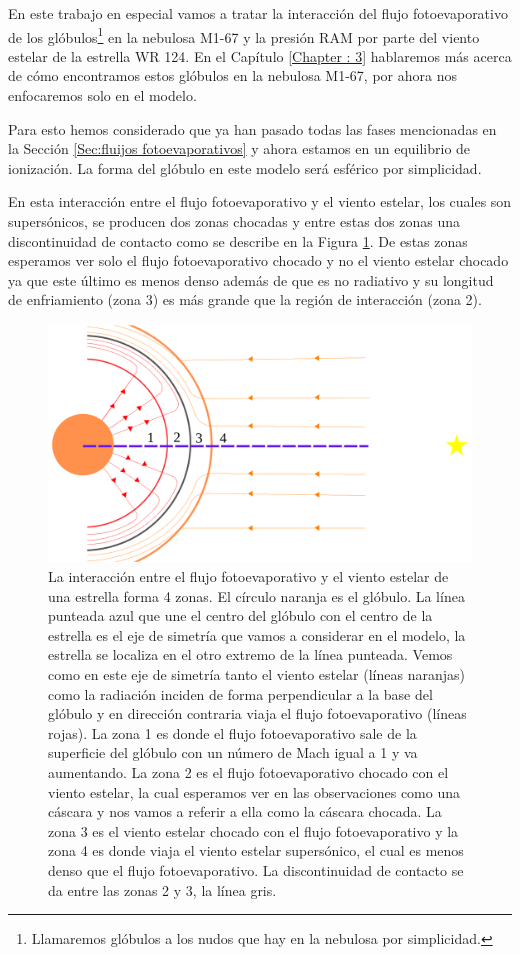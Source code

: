 \documentclass{book}
\begin{document}
En este trabajo en especial vamos a tratar la interacción del flujo fotoevaporativo de los glóbulos\footnote{Llamaremos glóbulos a los nudos que hay en la nebulosa por simplicidad.} en la nebulosa M1-67 y la presión RAM por parte del viento estelar de la estrella WR 124. En el Capítulo \ref{Chapter : 3} hablaremos más acerca de cómo encontramos estos glóbulos en la nebulosa M1-67, por ahora nos enfocaremos solo en el modelo.

Para esto hemos considerado que ya han pasado todas las fases mencionadas en la Sección \ref{Sec:fluijos fotoevaporativos} y ahora estamos en un equilibrio de ionización. La forma del glóbulo en este modelo será esférico por simplicidad.

En esta interacción entre el flujo fotoevaporativo y el viento estelar, los cuales son supersónicos, se producen dos zonas chocadas y entre estas dos zonas una discontinuidad de contacto como se describe en la Figura \ref{fig:zones}. De estas zonas esperamos ver solo el flujo fotoevaporativo chocado y no el viento estelar chocado ya que este último es menos denso además de que es no radiativo y su longitud de enfriamiento (zona 3) es más grande que la región de interacción (zona 2).

\begin{figure}[htb]
    \centering    \includegraphics[width=\textwidth]{imagenes_corregidas/Arreglo 01.pdf}
    \caption{La interacción entre el flujo fotoevaporativo y el viento estelar de una estrella forma 4 zonas. El círculo naranja es el glóbulo. La línea punteada azul que une el centro del  glóbulo con el centro de la estrella es el eje de simetría que vamos a considerar en el modelo, la estrella se localiza en el otro extremo de la línea punteada. Vemos como en este eje de simetría tanto el viento estelar (líneas naranjas) como la radiación inciden de forma perpendicular a la base del glóbulo y en dirección contraria viaja el flujo fotoevaporativo (líneas rojas). La zona 1 es donde el flujo fotoevaporativo sale de la superficie del glóbulo con un número de Mach igual a 1 y va aumentando. La zona 2 es el flujo fotoevaporativo chocado con el viento estelar, la cual esperamos ver en las observaciones como una cáscara y nos vamos a referir a ella como la cáscara chocada. La zona 3 es el viento estelar chocado con el flujo fotoevaporativo y la zona 4 es donde viaja el viento estelar supersónico, el cual es menos denso que el flujo fotoevaporativo. La discontinuidad de contacto se da entre las zonas 2 y 3, la línea gris.}
    \label{fig:zones}
\end{figure}
\end{document}
